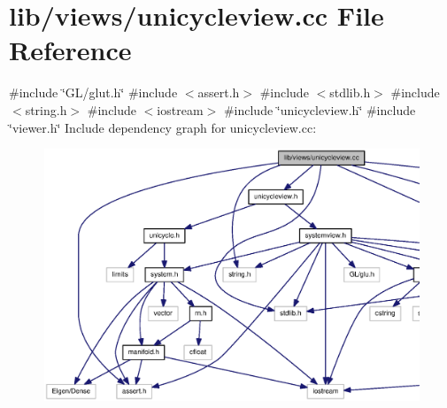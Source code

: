 \section{lib/views/unicycleview.cc \-File \-Reference}
\label{unicycleview_8cc}
{\ttfamily \#include \char`\"{}\-G\-L/glut.\-h\char`\"{}}\*
{\ttfamily \#include $<$assert.\-h$>$}\*
{\ttfamily \#include $<$stdlib.\-h$>$}\*
{\ttfamily \#include $<$string.\-h$>$}\*
{\ttfamily \#include $<$iostream$>$}\*
{\ttfamily \#include \char`\"{}unicycleview.\-h\char`\"{}}\*
{\ttfamily \#include \char`\"{}viewer.\-h\char`\"{}}\*
\-Include dependency graph for unicycleview.\-cc\-:
\nopagebreak
\begin{figure}[H]
\begin{center}
\leavevmode
\includegraphics[width=350pt]{unicycleview_8cc__incl}
\end{center}
\end{figure}
